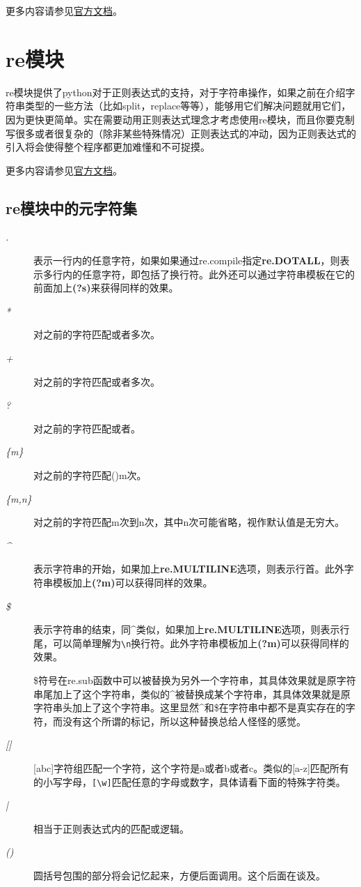 \documentclass[12pt,oneside]{book}
\begin{document}
\begin{common-format}
\begin{large}
更多内容请参见\href{https://docs.python.org/3/library/collections.html}{官方文档}。
\end{large}



\chapter{re模块}
\label{sec:re模块}
re模块提供了python对于正则表达式的支持，对于字符串操作，如果之前在介绍字符串类型的一些方法（比如split，replace等等），能够用它们解决问题就用它们，因为更快更简单。实在需要动用正则表达式理念才考虑使用re模块，而且你要克制写很多或者很复杂的（除非某些特殊情况）正则表达式的冲动，因为正则表达式的引入将会使得整个程序都更加难懂和不可捉摸。

\begin{large}
更多内容请参见\href{https://docs.python.org/3/library/re.html}{官方文档}。
\end{large}

\section{re模块中的元字符集}
\begin{description}
\item[\emph{.}] 表示一行内的任意字符，如果如果通过re.compile指定\textbf{re.DOTALL}，则表示多行内的任意字符，即包括了换行符。此外还可以通过字符串模板在它的前面加上\textbf{(?s)}来获得同样的效果。
\item[\emph{*}] 对之前的字符匹配或者多次。
\item[\emph{+}] 对之前的字符匹配或者多次。
\item[\emph{?}] 对之前的字符匹配或者。
\item[\emph{\{m\}}] 对之前的字符匹配()m次。
\item[\emph{\{m,n\}}] 对之前的字符匹配m次到n次，其中n次可能省略，视作默认值是无穷大。
\item[\emph{\^{}}] 表示字符串的开始，如果加上\textbf{re.MULTILINE}选项，则表示行首。此外字符串模板加上\textbf{(?m)}可以获得同样的效果。
\item[\emph{\${}}] 表示字符串的结束，同\^{}类似，如果加上\textbf{re.MULTILINE}选项，则表示行尾，可以简单理解为\verb+\n+换行符。此外字符串模板加上\textbf{(?m)}可以获得同样的效果。

\${}符号在re.sub函数中可以被替换为另外一个字符串，其具体效果就是原字符串尾加上了这个字符串，类似的\^{}被替换成某个字符串，其具体效果就是原字符串头加上了这个字符串。这里显然\^{}和\${}在字符串中都不是真实存在的字符，而没有这个所谓的标记，所以这种替换总给人怪怪的感觉。
\item[\emph{[]}] [abc]字符组匹配一个字符，这个字符是a或者b或者c。类似的[a-z]匹配所有的小写字母，\verb+[\w]+匹配任意的字母或数字，具体请看下面的特殊字符类。
\item[\emph{|}] 相当于正则表达式内的匹配或逻辑。
\item[\emph{()}] 圆括号包围的部分将会记忆起来，方便后面调用。这个后面在谈及。
\end{description}




\end{common-format}
\end{document}
